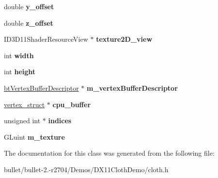 \begin{DoxyCompactItemize}
\item 
\hypertarget{classpiece__of__cloth_ad7cbe62e64529975b501e48e444291c7}{double {\bfseries y\+\_\+offset}}\label{classpiece__of__cloth_ad7cbe62e64529975b501e48e444291c7}

\item 
\hypertarget{classpiece__of__cloth_a9ae388d93fce32c6d69977f08cc45d4a}{double {\bfseries z\+\_\+offset}}\label{classpiece__of__cloth_a9ae388d93fce32c6d69977f08cc45d4a}

\item 
\hypertarget{classpiece__of__cloth_a7fac712700f4db0c81b473ad2558844b}{I\+D3\+D11\+Shader\+Resource\+View $\ast$ {\bfseries texture2\+D\+\_\+view}}\label{classpiece__of__cloth_a7fac712700f4db0c81b473ad2558844b}

\item 
\hypertarget{classpiece__of__cloth_a16d6a48b2d9fa574ab34610f0212b8a4}{int {\bfseries width}}\label{classpiece__of__cloth_a16d6a48b2d9fa574ab34610f0212b8a4}

\item 
\hypertarget{classpiece__of__cloth_a1283c89227450e3ada2bf9f0aef66857}{int {\bfseries height}}\label{classpiece__of__cloth_a1283c89227450e3ada2bf9f0aef66857}

\item 
\hypertarget{classpiece__of__cloth_a25b3361ba14d0c8204598c48adaa846c}{\hyperlink{classbt_vertex_buffer_descriptor}{bt\+Vertex\+Buffer\+Descriptor} $\ast$ {\bfseries m\+\_\+vertex\+Buffer\+Descriptor}}\label{classpiece__of__cloth_a25b3361ba14d0c8204598c48adaa846c}

\item 
\hypertarget{classpiece__of__cloth_a7d772ca056b5fa8b4464b2a1547cbfef}{\hyperlink{structvertex__struct}{vertex\+\_\+struct} $\ast$ {\bfseries cpu\+\_\+buffer}}\label{classpiece__of__cloth_a7d772ca056b5fa8b4464b2a1547cbfef}

\item 
\hypertarget{classpiece__of__cloth_a8cbae097643767c4c82eec7907bdef0b}{unsigned int $\ast$ {\bfseries indices}}\label{classpiece__of__cloth_a8cbae097643767c4c82eec7907bdef0b}

\item 
\hypertarget{classpiece__of__cloth_aca22eef3293d37249d86114b8413ce82}{G\+Luint {\bfseries m\+\_\+texture}}\label{classpiece__of__cloth_aca22eef3293d37249d86114b8413ce82}

\end{DoxyCompactItemize}


The documentation for this class was generated from the following file\+:\begin{DoxyCompactItemize}
\item 
bullet/bullet-\/2.-\/r2704/\+Demos/\+D\+X11\+Cloth\+Demo/cloth.\+h\end{DoxyCompactItemize}
